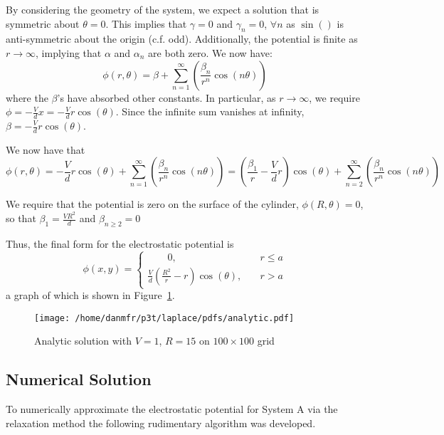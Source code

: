 \documentclass[12pt, a4paper]{article}
\newcommand{\be}{\begin{equation}}
\newcommand{\ee}{\end{equation}}
\begin{document}
By considering the geometry of the system, we expect a solution that is symmetric
about $\theta=0$. This implies that $\gamma = 0$ and $\gamma_n=0$, $\forall n$ as
$\sin()$ is anti-symmetric about the origin (c.f. odd). Additionally, the potential
is finite as $r \rightarrow \infty$, implying that $\alpha$ and $\alpha_n$ are both
zero. We now have:
%
\be
\phi(r,\theta)=\beta + \sum_{n=1}^{\infty}(\frac{\beta_n}{r^n} \cos(n\theta))
\ee
%
where the $\beta$'s have absorbed other constants. In particular, as
$r \rightarrow \infty$, we require $\phi=-\frac{V}{d}x=-\frac{V}{d}r\cos(\theta)$.
Since the infinite sum vanishes at infinity, $\beta=-\frac{V}{d}r\cos(\theta)$.

We now have that
%
\be
\phi(r,\theta)=-\frac{V}{d}r\cos(\theta) + \sum_{n=1}^{\infty}(\frac{\beta_n}{r^n} \cos(n\theta))
              =(\frac{\beta_1}{r}-\frac{V}{d}r)\cos(\theta) + \sum_{n=2}^{\infty}(\frac{\beta_n}{r^n} \cos(n\theta))
\ee

We require that the potential is zero on the surface of the cylinder,
$\phi(R,\theta)=0$, so that $\beta_1=\frac{VR^2}{d}$ and $\beta_{n \geq 2}=0$

Thus, the final form for the electrostatic potential is
%
\be
\phi(x,y)=
\begin{cases} \qquad 0, & \quad r \leq a \\
\frac{V}{d}(\frac{R^2}{r}-r)\cos(\theta), & \quad r > a
\end{cases}
\ee
%
a graph of which is shown in Figure~\ref{fig:analytic}.

\begin{figure}
\begin{center}
\texttt{[image: /home/danmfr/p3t/laplace/pdfs/analytic.pdf]}
\caption{Analytic solution with $V=1$, $R=15$ on $100\times100$ grid}
\label{fig:analytic}
\end{center}
\end{figure}

\subsection{Numerical Solution}

To numerically approximate the electrostatic potential for System A via the 
relaxation method the following rudimentary algorithm was developed.
\end{document}
